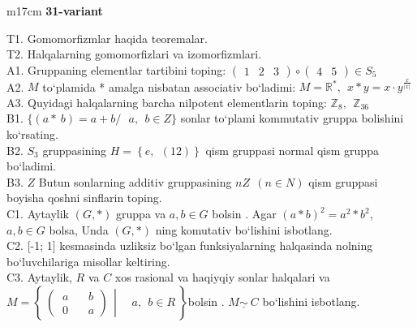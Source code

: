 \documentclass{article}
\begin{document}
\begin{tabular}{m{17cm}}
\textbf{31-variant}
\newline

T1. Gomomorfizmlar haqida teoremalar. \\
T2. Halqalarning gomomorfizlari va izomorfizmlari. \\
A1. Gruppaning elementlar tartibini toping: \(\begin{pmatrix}
1 & 2 & 3
\end{pmatrix} \circ \begin{pmatrix}
4 & 5
\end{pmatrix} \in S_{5}\) \\
A2. \(M\) to`plamida * amalga nisbatan associativ bo`ladimi: \(M = \mathbb{R}^{*},\ \ x*y = x \cdot y^{\frac{x}{|x|}}\) \\
A3. Quyidagi halqalarning barcha nilpotent elementlarin toping: \(\mathbb{Z}_{8},\ \ \mathbb{Z}_{36}\) \\
B1. \(\{(a*\ b) = a + b/\ \ \ a,\ \ b \in Z\}\) sonlar to`plami kommutativ gruppa bolishini ko`rsating. \\
B2. \(S_{3}\) gruppasining \(H = \left\{ e,\ \ (12) \right\}\) qism gruppasi normal qism gruppa bo`ladimi. \\
B3. \(Z\) Butun sonlarning additiv gruppasining \(nZ\ \ (n \in N)\) qism gruppasi boyisha qo\textquotesingle shni sinflarin toping. \\
C1. Aytaylik \((G,*)\) gruppa va \(a,b \in G\) bo\textquotesingle lsin . Agar \((a*b)^{2} = a^{2}*b^{2}\), \(a,b \in G\) bolsa, Unda \((G,*)\) ning komutativ bo`lishini isbotlang. \\
C2. {[}-1; 1{]} kesmasinda uzliksiz bo`lgan funksiyalarning halqasinda nolning bo`luvchilariga misollar keltiring. \\
C3. Aytaylik, \(R\) va \(C\) xos rasional va haqiyqiy sonlar halqalari va\(M = \left\{ \left. \ \begin{pmatrix}
\ a\ \ \ \ \ \ \ \ b \\
\ 0\ \ \ \ \ \ \ \ a
\end{pmatrix}\ \  \right|\ \ \ \ \ \ a,\ \ b \in R\  \right\}\)bo\textquotesingle lsin . \(M\underline{\sim}\ C\) bo`lishini isbotlang. \\

\end{tabular}
\vspace{1cm}
\end{document}
